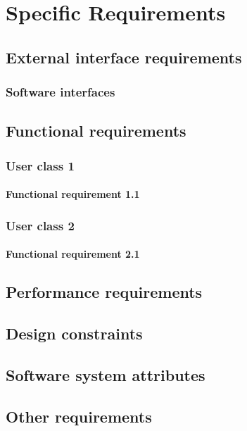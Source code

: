 \chapter{Specific Requirements}

\section{External interface requirements}

\subsection{Software interfaces}

\section{Functional requirements}
\subsection{User class 1}
\subsubsection{Functional requirement 1.1}
\subsection{User class 2}
\subsubsection{Functional requirement 2.1}

\section{Performance requirements}
\section{Design constraints}
\section{Software system attributes}
\section{Other requirements}